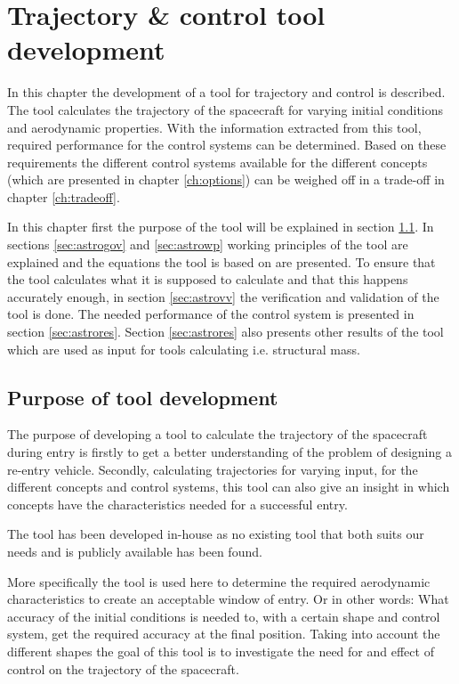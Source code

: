 \section{Trajectory \& control tool development}
\label{ch:astrocontrol}
In this chapter the development of a tool for trajectory and control is described. The tool calculates the trajectory of the spacecraft for varying initial conditions and aerodynamic properties. With the information extracted from this tool, required performance for the control systems can be determined. Based on these requirements the different control systems available for the different concepts (which are presented in chapter \ref{ch:options}) can be weighed off in a trade-off in chapter \ref{ch:tradeoff}.

In this chapter first the purpose of the tool will be explained in section \ref{sec:astropurpose}. In sections \ref{sec:astrogov} and \ref{sec:astrowp} working principles of the tool are explained and the equations the tool is based on are presented. To ensure that the tool calculates what it is supposed to calculate and that this happens accurately enough, in section \ref{sec:astrovv} the verification and validation of the tool is done. The needed performance of the control system is presented in section \ref{sec:astrores}. Section \ref{sec:astrores} also presents other results of the tool which are used as input for tools calculating i.e. structural mass.

\subsection{Purpose of tool development}
\label{sec:astropurpose}
The purpose of developing a tool to calculate the trajectory of the spacecraft during entry is firstly to get a better understanding of the problem of designing a re-entry vehicle. Secondly, calculating trajectories for varying input, for the different concepts and control systems, this tool can also give an insight in which concepts have the characteristics needed for a successful entry.

The tool has been developed in-house as no existing tool that both suits our needs and is publicly available has been found.

More specifically the tool is used here to determine the required aerodynamic characteristics to create an acceptable window of entry. Or in other words: What accuracy of the initial conditions is needed to, with a certain shape and control system, get the required accuracy at the final position. Taking into account the different shapes the goal of this tool is to investigate the need for and effect of control on the trajectory of the spacecraft.


